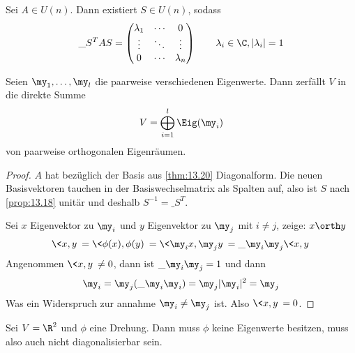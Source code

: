 \documentclass[a4paper, 10pt]{scrbook}
\begin{document}
\begin{kor}
	\label{kor:13.21}
	Sei $A\in U(n)$.
	Dann existiert $S\in U(n)$, sodass
	\[
	\_S^TAS = \begin{pmatrix}\lambda_1 & \cdots & 0\\\vdots& \ddots & \vdots\\0&\cdots & \lambda_n \end{pmatrix} \qquad \lambda_i \in \C, |\lambda_i| = 1
	\]
	
	Seien $\my_1,\dotsc,\my_l$ die paarweise verschiedenen Eigenwerte.
	Dann zerfällt $V$ in die direkte Summe
	\[
		V = \bigoplus_{i=1}^l \Eig(\my_i)
	\]
	von paarweise orthogonalen Eigenräumen.
	\begin{proof}
		$A$ hat bezüglich der Basis aus \ref{thm:13.20} Diagonalform.
		Die neuen Basisvektoren tauchen in der Basiswechselmatrix als Spalten auf, also ist $S$ nach \ref{prop:13.18} unitär und deshalb $S^{-1}=\_S^T$.

		Sei $x$ Eigenvektor zu $\my_i$ und $y$ Eigenvektor zu $\my_j$ mit $i\neq j$, zeige: $x\orth y$
		\[
			\<x,y\> = \<\phi(x),\phi(y)\> = \<\my_i x,\my_j y\> = \_{\my_i}\my_j\<x,y\>
		\]
		Angenommen $\<x,y\> \neq 0$, dann ist $\_{\my_i}\my_j = 1$  und dann
		\[
			\my_i = \my_j(\_{\my_i}\my_i) = \my_j|\my_i|^2 = \my_j
		\]
		Was ein Widerspruch zur annahme $\my_i\neq \my_j$ ist.
		Also $\<x,y\> = 0$.
	\end{proof}
\end{kor}

\begin{ex}
	Sei $V=\R^2$ und $\phi$ eine Drehung.
	Dann muss $\phi$ keine Eigenwerte besitzen, muss also auch nicht diagonalisierbar sein.
\end{ex}
\end{document}
